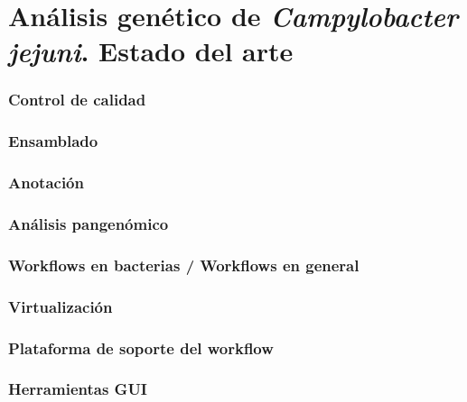 \chapter{Análisis genético de \textit{Campylobacter jejuni}. Estado del arte}
\label{chap:estadodelarte}



\subsection{Control de calidad}
\subsection{Ensamblado}
\subsection{Anotación}
\subsection{Análisis pangenómico}
\subsection{Workflows en bacterias / Workflows en general} %

\subsection{Virtualización}
\subsection{Plataforma de soporte del workflow}
\subsection{Herramientas GUI}










\newpage \thispagestyle{empty} %